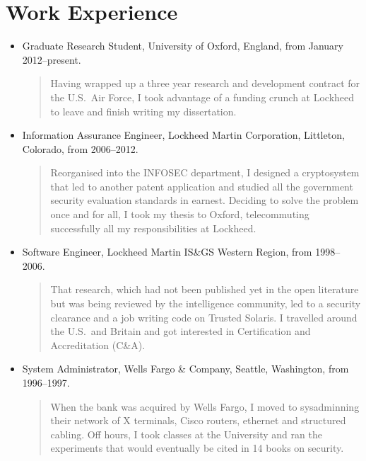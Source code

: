 \documentclass[letterpaper]{article}
\begin{document}
\section*{Work Experience} %

\begin{itemize}
	\item Graduate Research Student, University of Oxford, England, from January 2012--present.

		\begin{quote}\vspace{-2mm}
			Having wrapped up a three year research and development contract for the U.S.\ Air
			Force, I took advantage of a funding crunch at Lockheed to leave and finish writing
			my dissertation.
		\end{quote}

	\item Information Assurance Engineer, Lockheed Martin Corporation, Littleton, Colorado, from
		2006--2012.

		\begin{quote}\vspace{-2mm}
			Reorganised into the INFOSEC department, I designed a cryptosystem that led to another
			patent application and studied all the government security evaluation standards in
			earnest.  Deciding to solve the problem once and for all, I took my thesis to Oxford,
			telecommuting successfully all my responsibilities at Lockheed.
		\end{quote}

	\item Software Engineer, Lockheed Martin IS\&GS Western Region, from 1998--2006.

		\begin{quote}\vspace{-2mm}
			That research, which had not been published yet in the open literature but was being
			reviewed by the intelligence community, led to a security clearance and a job writing
			code on Trusted Solaris.  I travelled around the U.S.\ and Britain and got interested
			in Certification and Accreditation (C\&A).
		\end{quote}

	\item System Administrator, Wells Fargo \& Company, Seattle, Washington, from  1996--1997.

		\begin{quote}\vspace{-2mm}
			When the bank was acquired by Wells Fargo, I moved to sysadminning their network of X
			terminals, Cisco routers, ethernet and structured cabling.  Off hours, I took classes
			at the University and ran the experiments that would eventually be cited in 14 books
			on security.
		\end{quote}


\end{itemize}
\end{document}
